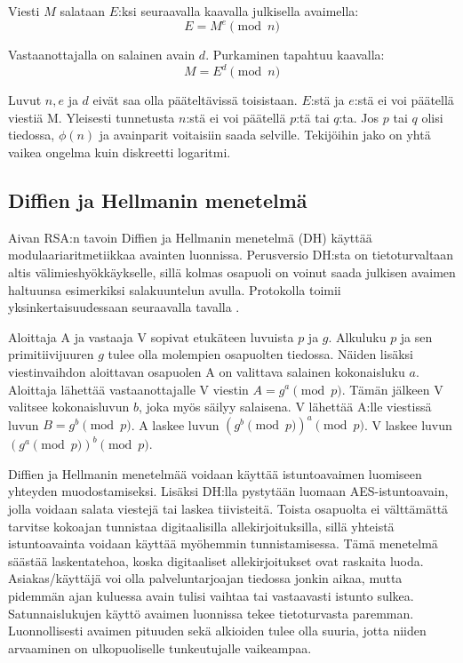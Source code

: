 \documentclass[finnish]{tktltiki2}
\theoremstyle{definition}
\theoremstyle{remark}
\begin{document}
Viesti $M$ salataan $E$:ksi seuraavalla kaavalla julkisella avaimella: $$E = M^e \pmod{n}$$

Vastaanottajalla on salainen avain $d$. Purkaminen tapahtuu kaavalla: 
$$ M = E^d \pmod{n} $$

Luvut $n, e$ ja $d$ eivät saa olla pääteltävissä toisistaan. $E$:stä ja $e$:stä ei voi päätellä viestiä M. Yleisesti tunnetusta $n$:stä ei voi päätellä $p$:tä tai $q$:ta. Jos $p$ tai $q$ olisi tiedossa, $\phi(n)$ ja avainparit voitaisiin saada selville. Tekijöihin jako on yhtä vaikea ongelma kuin diskreetti logaritmi. \cite{math1}


\subsection{Diffien ja Hellmanin menetelmä}

Aivan RSA:n tavoin Diffien ja Hellmanin menetelmä (DH) käyttää modulaariaritmetiikkaa avainten luonnissa. Perusversio DH:sta on tietoturvaltaan altis välimieshyökkäykselle, sillä kolmas osapuoli on voinut saada julkisen avaimen haltuunsa esimerkiksi salakuuntelun avulla. Protokolla toimii yksinkertaisuudessaan seuraavalla tavalla \cite{math2}.

Aloittaja A ja vastaaja V sopivat etukäteen luvuista $p$ ja $g$. Alkuluku  $p$ ja sen primitiivijuuren $g$ tulee olla molempien osapuolten tiedossa. Näiden lisäksi viestinvaihdon aloittavan osapuolen A on valittava salainen kokonaisluku $a$. Aloittaja lähettää vastaanottajalle V viestin $A = g^a \pmod{p}$. Tämän jälkeen V valitsee kokonaisluvun $b$, joka myös säilyy salaisena. V lähettää A:lle viestissä luvun $B = g^b \pmod{p}$. A laskee luvun $(g^b \pmod{p})^a \pmod{p}$. V laskee luvun $(g^a \pmod{p})^b \pmod{p}$.

Diffien ja Hellmanin menetelmää voidaan käyttää istuntoavaimen luomiseen yhteyden muodostamiseksi. Lisäksi DH:lla pystytään luomaan AES-istuntoavain, jolla voidaan salata viestejä tai laskea tiivisteitä. Toista osapuolta ei välttämättä tarvitse kokoajan tunnistaa digitaalisilla allekirjoituksilla, sillä yhteistä istuntoavainta voidaan käyttää myöhemmin tunnistamisessa. Tämä menetelmä säästää laskentatehoa, koska digitaaliset allekirjoitukset ovat raskaita luoda. Asiakas/käyttäjä voi olla palveluntarjoajan tiedossa jonkin aikaa, mutta pidemmän ajan kuluessa avain tulisi vaihtaa tai vastaavasti istunto sulkea. Satunnaislukujen käyttö avaimen luonnissa tekee tietoturvasta paremman. Luonnollisesti avaimen pituuden sekä alkioiden tulee olla suuria, jotta niiden arvaaminen on ulkopuoliselle tunkeutujalle vaikeampaa. \cite{enti}
\end{document}
